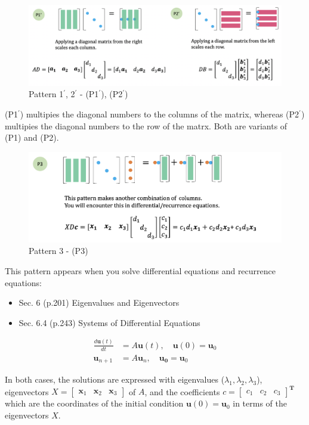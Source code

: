 \documentclass[letterpaper]{article}
\begin{document}
\begin{figure}[H]
  \includegraphics[keepaspectratio, width=\linewidth]{Pattern11-22.png}
  \caption{Pattern 1$^\prime$, 2$^\prime$ - (P1$^\prime$), (P2$^\prime$)}
\end{figure}

(P1$^\prime$) multipies the diagonal numbers to the columns of the matrix,
whereas (P2$^\prime$) multipies the diagonal numbers to the row of the matrx.
Both are variants of (P1) and (P2).

\begin{figure}[H]
  \includegraphics[keepaspectratio, width=\linewidth]{Pattern3.png}
  \caption{Pattern 3 - (P3)}
\end{figure}

This pattern appears when you solve differential equations and recurrence equations:

\begin{itemize}
  \item Sec. 6 (p.201) Eigenvalues and Eigenvectors
  \item Sec. 6.4 (p.243) Systems of Differential Equations
\end{itemize} 

\begin{align*}
  \frac{d \bm{u}(t) }{dt} &= A \bm{u}(t), \quad \bm{u}(0)=\bm{u}_0\\
  \bm{u}_{n+1} &= A \bm{u}_n, \quad \bm{u_0} = \bm{u}_0
\end{align*}

In both cases, the solutions are expressed with
eigenvalues ($\lambda_1, \lambda_2, \lambda_3$), 
eigenvectors $X=\begin{bmatrix} \bm{x}_1 & \bm{x}_2 & \bm{x}_3 \end{bmatrix}$ of $A$, and
the coefficients $c=\begin{bmatrix} c_1 & c_2 & c_3 \end{bmatrix}^\mathbf{T}$
which are the coordinates of the initial condition $\bm{u}(0)=\bm{u}_0$ in terms of
the eigenvectors $X$.
\end{document}
